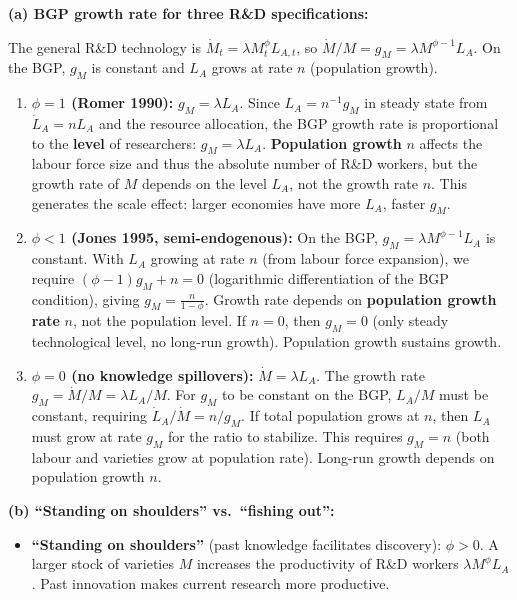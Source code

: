 \documentclass[a4paper,11pt]{article}
\begin{document}
\begin{answerbox}
\textbf{(a) BGP growth rate for three R\&D specifications:}

The general R\&D technology is $\dot{M}_t = \lambda M_t^\phi L_{A,t}$, so $\dot{M}/M = g_M = \lambda M^{\phi-1}L_A$.  On the BGP, $g_M$ is constant and $L_A$ grows at rate $n$ (population growth).

\begin{enumerate}[label=(\roman*), itemsep=4pt]
    \item \textbf{$\phi = 1$ (Romer 1990):} $g_M = \lambda L_A$. Since $L_A = n^{-1}g_M$ in steady state from $\dot{L}_A = nL_A$ and the resource allocation, the BGP growth rate is proportional to the \textbf{level} of researchers: $g_M = \lambda L_A$. \textbf{Population growth} $n$ affects the labour force size and thus the absolute number of R\&D workers, but the growth rate of $M$ depends on the level $L_A$, not the growth rate $n$. This generates the scale effect: larger economies have more $L_A$, faster $g_M$.

    \item \textbf{$\phi < 1$ (Jones 1995, semi-endogenous):} On the BGP, $g_M = \lambda M^{\phi-1}L_A$ is constant. With $L_A$ growing at rate $n$ (from labour force expansion), we require $(\phi-1)g_M + n = 0$ (logarithmic differentiation of the BGP condition), giving $\boxed{g_M = \frac{n}{1-\phi}}$. Growth rate depends on \textbf{population growth rate} $n$, not the population level. If $n=0$, then $g_M = 0$ (only steady technological level, no long-run growth). Population growth sustains growth.

    \item \textbf{$\phi = 0$ (no knowledge spillovers):} $\dot{M} = \lambda L_A$. The growth rate $g_M = \dot{M}/M = \lambda L_A / M$. For $g_M$ to be constant on the BGP, $L_A/M$ must be constant, requiring $\dot{L}_A/\dot{M} = n/g_M$. If total population grows at $n$, then $L_A$ must grow at rate $g_M$ for the ratio to stabilize. This requires $g_M = n$ (both labour and varieties grow at population rate). Long-run growth depends on population growth $n$.
\end{enumerate}

\textbf{(b) ``Standing on shoulders'' vs.\ ``fishing out'':}

\begin{itemize}
    \item \textbf{``Standing on shoulders''} (past knowledge facilitates discovery): $\phi > 0$. A larger stock of varieties $M$ increases the productivity of R\&D workers $\lambda M^\phi L_A$. Past innovation makes current research more productive.


\end{itemize}
\end{answerbox}
\end{document}
